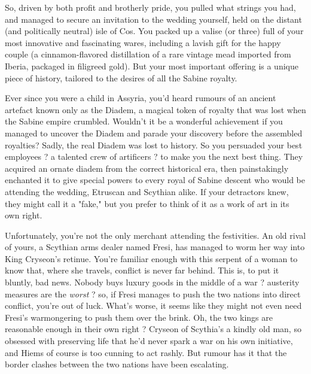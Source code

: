 \documentclass[char]{Kos}
\begin{document}
So, driven by both profit and brotherly pride, you pulled what strings you had, and managed to secure an invitation to the wedding yourself, held on the distant (and politically neutral) isle of Cos. You packed up a valise (or three) full of your most innovative and fascinating wares, including a lavish gift for the happy couple (a cinnamon-flavored distillation of a rare vintage mead imported from Iberia, packaged in filigreed gold). But your most important offering is a unique piece of history, tailored to the desires of all the Sabine royalty. 

Ever since you were a child in Assyria, you'd heard rumours of an ancient artefact known only as the Diadem, a magical token of royalty that was lost when the Sabine empire crumbled. Wouldn't it be a wonderful achievement if you managed to uncover the Diadem and parade your discovery before the assembled royalties? Sadly, the real Diadem was lost to history. So you persuaded your best employees ? a talented crew of artificers ? to make you the next best thing. They acquired an ornate diadem from the correct historical era, then painstakingly enchanted it to give special powers to every royal of Sabine descent who would be attending the wedding, Etruscan and Scythian alike. If your detractors knew, they might call it a "fake," but you prefer to think of it as a work of art in its own right.

Unfortunately, you're not the only merchant attending the festivities. An old rival of yours, a Scythian arms dealer named Fresi, has managed to worm her way into King Cryseon's retinue. You're familiar enough with this serpent of a woman to know that, where she travels, conflict is never far behind. This is, to put it bluntly, bad news. Nobody buys luxury goods in the middle of a war ? austerity measures are the \textit{worst} ? so, if Fresi manages to push the two nations into direct conflict, you're out of luck. What's worse, it seems like they might not even need Fresi's warmongering to push them over the brink. Oh, the two kings are reasonable enough in their own right ? Cryseon of Scythia's a kindly old man, so obsessed with preserving life that he'd never spark a war on his own initiative, and Hiems of course is too cunning to act rashly. But rumour has it that the border clashes between the two nations have been escalating. 
\end{document}
